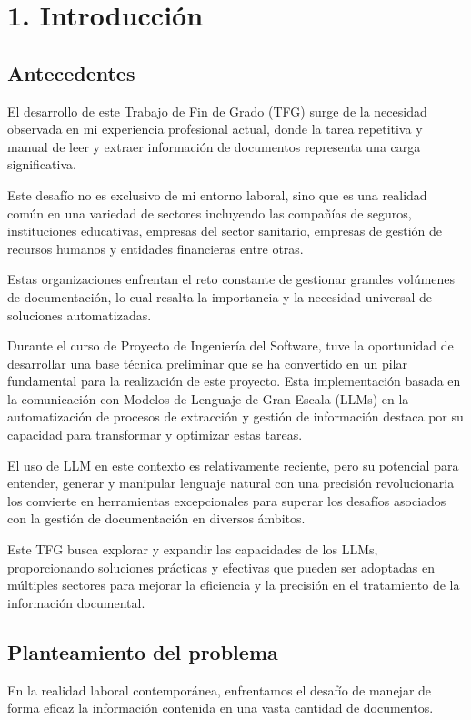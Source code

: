 \chapter*{1. Introducción}\label{ch:chapter_1}
\section*{Antecedentes}
El desarrollo de este Trabajo de Fin de Grado (TFG) surge de la necesidad observada en mi experiencia profesional
actual, donde la tarea repetitiva y manual de leer y extraer información de documentos representa una carga
significativa.

Este desafío no es exclusivo de mi entorno laboral, sino que es una realidad común en una variedad de sectores
incluyendo las compañías de seguros, instituciones educativas, empresas del sector sanitario, empresas de gestión de
recursos humanos y entidades financieras entre otras.

Estas organizaciones enfrentan el reto constante de gestionar grandes volúmenes de documentación, lo cual resalta la
importancia y la necesidad universal de soluciones automatizadas.

Durante el curso de Proyecto de Ingeniería del Software, tuve la oportunidad de desarrollar una base técnica preliminar
que se ha convertido en un pilar fundamental para la realización de este proyecto.
Esta implementación basada en la comunicación con Modelos de Lenguaje de Gran Escala (LLMs) en la automatización de
procesos de extracción y gestión de información destaca por su capacidad para transformar y optimizar estas tareas.

El uso de LLM en este contexto es relativamente reciente, pero su potencial para entender, generar y manipular lenguaje
natural con una precisión revolucionaria los convierte en herramientas excepcionales para superar los desafíos asociados
con la gestión de documentación en diversos ámbitos.

Este TFG busca explorar y expandir las capacidades de los LLMs, proporcionando soluciones prácticas y efectivas que
pueden ser adoptadas en múltiples sectores para mejorar la eficiencia y la precisión en el tratamiento de la información
documental.

\section*{Planteamiento del problema}
En la realidad laboral contemporánea, enfrentamos el desafío de manejar de forma eficaz la información contenida en una
vasta cantidad de documentos.

